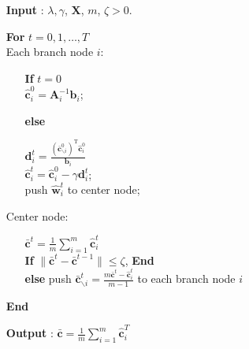 \documentclass{article}
\begin{document}
\begin{itemize}
  \item[\textbf{Input}]: $\lambda,\gamma$, $\mathbf X$, $m$, $\zeta>0$.
  \item[\textbf{For}] $t=0, 1, \ldots, T$\\
  Each branch node $i$:
   \begin{itemize}
    \item[\textbf{If}]$t=0$\\
     $\hat{\mathbf c}_i^0=\mathbf A_i^{-1} \mathbf b_i$;
    \end{itemize}
    \begin{itemize}
    \item[\textbf{else}]
    \item[ ]
     $\mathbf d_i^t=\frac{\left(\bar{\mathbf c}^0_{\backslash i}\right)^\mathrm{T}\hat{\mathbf c}_i^0}{\mathbf b_i}$\\
    $\hat{\mathbf c}_i^t=\hat{\mathbf c}_i^0-\gamma\mathbf d_i^t$;\\
     push $\hat{\mathbf w}_i^t$ to center node;
    \end{itemize}
   Center node:
    \begin{itemize}
      \item[ ]
      $\bar{\mathbf c}^t=\frac{1}{m}\sum_{i=1}^m\hat{\mathbf c}_i^t$\\
      \textbf{If} $\|\bar{\mathbf c}^{t}-\bar{\mathbf c}^{t-1}\|\leq \zeta$, \textbf{End}\\
              \textbf{else} push $\bar{\mathbf c}^{t}_{\backslash i}=\frac{m\bar{\mathbf c}^{t}-\hat{\mathbf c}_i^t}{m-1}$ to each branch node $i$
    \end{itemize}
    \item[\textbf{End}]
    \item[\textbf{Output}]: $\bar{\mathbf c}=\frac{1}{m}\sum_{i=1}^m\hat{\mathbf c}_i^T$
\end{itemize}
\end{document}

